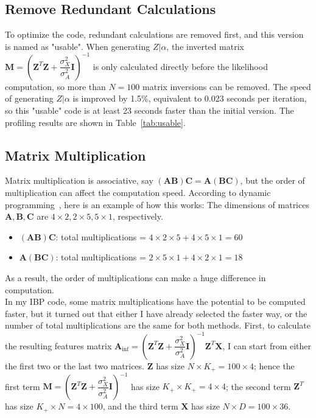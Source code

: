 \subsection{Remove Redundant Calculations}
\label{sub:usable}
To optimize the code, redundant calculations are removed first, and this version is named as "usable". When generating $Z|\alpha$, the inverted matrix $\mathbf{M} = (\mathbf{Z}^T\mathbf{Z}+\dfrac{\sigma_X^2}{\sigma_A^2}\mathbf{I})^{-1}$ is only calculated directly before the likelihood computation, so more than $N = 100$ matrix inversions can be removed. The speed of generating $Z|\alpha$ is improved by 1.5\%, equivalent to 0.023 seconds per iteration, so this "usable" code is at least 23 seconds faster than the initial version. The profiling results are shown in Table~\ref{tab:usable}. 

\subsection{Matrix Multiplication}
Matrix multiplication is associative, say $(\mathbf{A}\mathbf{B})\mathbf{C} = \mathbf{A}(\mathbf{B}\mathbf{C})$, but the order of multiplication can affect the computation speed. According to dynamic programming~\cite{matrixmult}, here is an example of how this works: The dimensions of matrices $\mathbf{A},\mathbf{B},\mathbf{C}$ are $4 \times 2,2 \times 5, 5 \times 1$, respectively.
\begin{itemize}
\item $(\mathbf{A}\mathbf{B})\mathbf{C}$: total multiplications = $4 \times 2 \times 5 + 4 \times 5 \times 1 = 60$
\item $\mathbf{A}(\mathbf{B}\mathbf{C})$: total multiplications = $2 \times 5 \times 1 + 4 \times 2 \times 1 = 18$
\end{itemize}
As a result, the order of multiplications can make a huge difference in computation.\\

In my IBP code, some matrix multiplications have the potential to be computed faster, but it turned out that either I have already selected the faster way, or the number of total multiplications are the same for both methods. First, to calculate the resulting features matrix $\mathbf{A}_{\text{inf}} = (\mathbf{Z}^T\mathbf{Z}+\dfrac{\sigma_X^2}{\sigma_A^2}\mathbf{I})^{-1}\mathbf{Z}^T \mathbf{X}$, I can start from either the first two or the last two matrices. $\mathbf{Z}$ has size $N \times K_+ = 100 \times 4$; hence the first term $\mathbf{M} = (\mathbf{Z}^T\mathbf{Z}+\dfrac{\sigma_X^2}{\sigma_A^2}\mathbf{I})^{-1}$ has size $K_+ \times K_+ = 4 \times 4$; the second term $\mathbf{Z}^T$ has size $K_+ \times N = 4 \times 100$, and the third term $\mathbf{X}$ has size $N \times D = 100 \times 36$.

